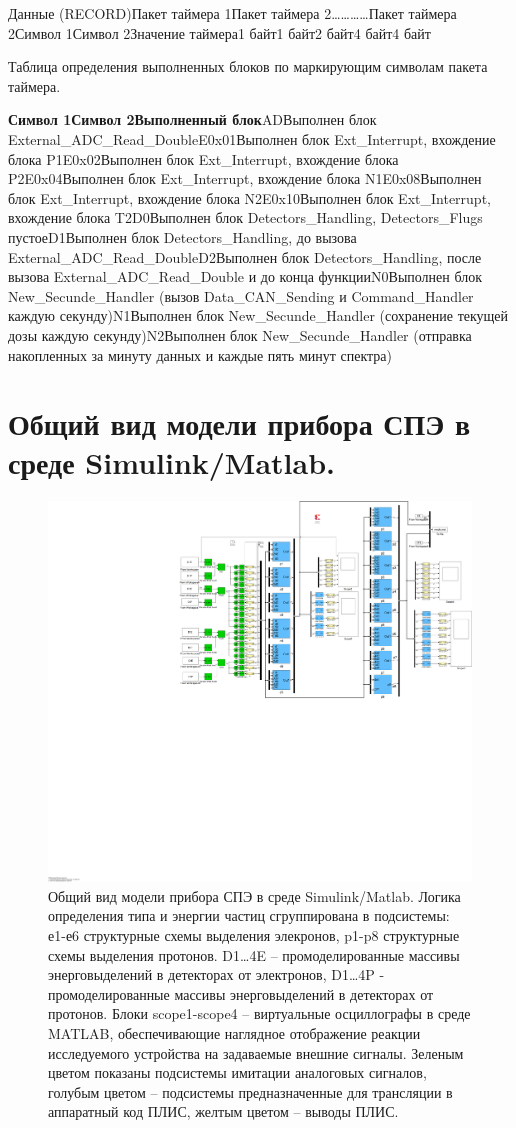 {\small Данные (RECORD)Пакет таймера 1Пакет таймера 2\ldots{}\ldots{}\ldots{}\ldots{}Пакет таймера 2Символ 1Символ 2Значение таймера1 байт1 байт2 байт4 байт4 байт}





Таблица определения выполненных блоков по маркирующим символам пакета таймера.


\textbf{Символ 1Символ 2Выполненный блок}ADВыполнен блок External\_ADC\_Read\_DoubleE0x01Выполнен блок Ext\_Interrupt, вхождение блока P1E0x02Выполнен блок Ext\_Interrupt, вхождение блока P2E0x04Выполнен блок Ext\_Interrupt, вхождение блока N1E0x08Выполнен блок Ext\_Interrupt, вхождение блока N2E0x10Выполнен блок Ext\_Interrupt, вхождение блока T2D0Выполнен блок Detectors\_Handling, Detectors\_Flugs пустоеD1Выполнен блок Detectors\_Handling, до вызова External\_ADC\_Read\_DoubleD2Выполнен блок Detectors\_Handling, после вызова External\_ADC\_Read\_Double и до конца функцииN0Выполнен блок New\_Secunde\_Handler (вызов Data\_CAN\_Sending и Command\_Handler каждую секунду)N1Выполнен блок New\_Secunde\_Handler (сохранение текущей дозы каждую секунду)N2Выполнен блок New\_Secunde\_Handler (отправка накопленных за минуту данных и каждые пять минут спектра)

\chapter{Общий вид модели прибора СПЭ в среде Simulink/Matlab.} \label{AppendixB}
\begin{figure}
	\centering
	\includegraphics[width=0.7\linewidth]{images/simulink}
	\caption{Общий вид модели прибора СПЭ в среде Simulink/Matlab. Логика определения типа и энергии частиц сгруппирована в подсистемы: е1-е6 структурные схемы выделения элекронов,  p1-p8 структурные схемы выделения протонов. D1…4E – промоделированные массивы энерговыделений в детекторах от электронов, D1…4P -  промоделированные массивы энерговыделений в детекторах от протонов. Блоки scope1-scope4 – виртуальные осциллографы в среде MATLAB, обеспечивающие наглядное отображение реакции исследуемого устройства на задаваемые внешние сигналы. Зеленым цветом показаны подсистемы имитации аналоговых сигналов, голубым цветом – подсистемы предназначенные для трансляции в аппаратный код ПЛИС, желтым цветом – выводы ПЛИС.}
	\label{fig:simulink}
\end{figure}

